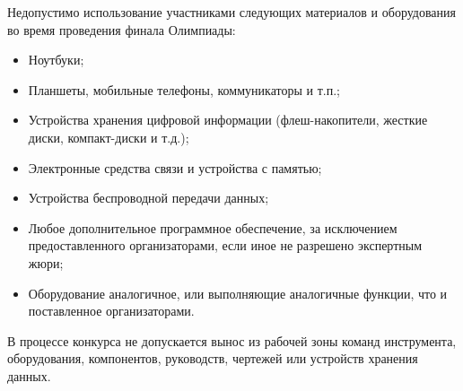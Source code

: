 Недопустимо использование участниками следующих материалов и оборудования во время проведения финала Олимпиады:
\begin{itemize}
    \item Ноутбуки;
    \item Планшеты, мобильные телефоны, коммуникаторы и т.п.;
    \item Устройства хранения цифровой информации (флеш-накопители, жесткие диски, компакт-диски и т.д.);
    \item Электронные средства связи и устройства с памятью;
    \item Устройства беспроводной передачи данных;
    \item Любое дополнительное программное обеспечение, за исключением предоставленного организаторами, если иное не разрешено экспертным жюри;
    \item Оборудование аналогичное, или выполняющие аналогичные функции, что и поставленное организаторами.
\end{itemize}

В процессе конкурса не допускается вынос из рабочей зоны команд инструмента, оборудования, компонентов, руководств, чертежей или устройств хранения данных.